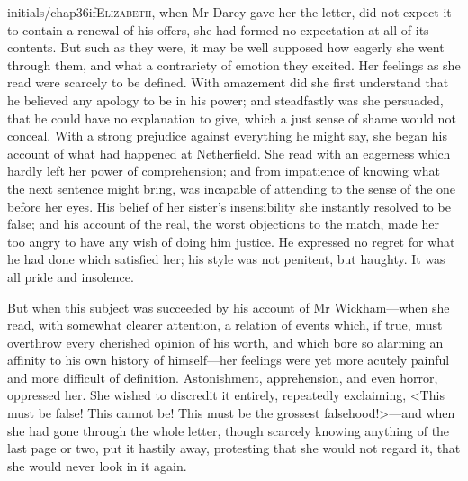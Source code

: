 \lettrine[lines=8,image=true]{initials/chap36if}{Elizabeth,} when Mr Darcy gave her the letter, did not expect it to contain a renewal of his offers, she had formed no expectation at all of its contents. But such as they were, it may be well supposed how eagerly she went through them, and what a contrariety of emotion they excited. Her feelings as she read were scarcely to be defined. With amazement did she first understand that he believed any apology to be in his power; and steadfastly was she persuaded, that he could have no explanation to give, which a just sense of shame would not conceal. With a strong prejudice against everything he might say, she began his account of what had happened at Netherfield. She read with an eagerness which hardly left her power of comprehension; and from impatience of knowing what the next sentence might bring, was incapable of attending to the sense of the one before her eyes. His belief of her sister's insensibility she instantly resolved to be false; and his account of the real, the worst objections to the match, made her too angry to have any wish of doing him justice. He expressed no regret for what he had done which satisfied her; his style was not penitent, but haughty. It was all pride and insolence.

But when this subject was succeeded by his account of Mr Wick\-ham—when she read, with somewhat clearer attention, a relation of events which, if true, must overthrow every cherished opinion of his worth, and which bore so alarming an affinity to his own history of himself—her feelings were yet more acutely painful and more difficult of definition. Astonishment, apprehension, and even horror, oppressed her. She wished to discredit it entirely, repeatedly exclaiming, <This must be false! This cannot be! This must be the grossest falsehood!>—and when she had gone through the whole letter, though scarcely knowing anything of the last page or two, put it hastily away, protesting that she would not regard it, that she would never look in it again.

